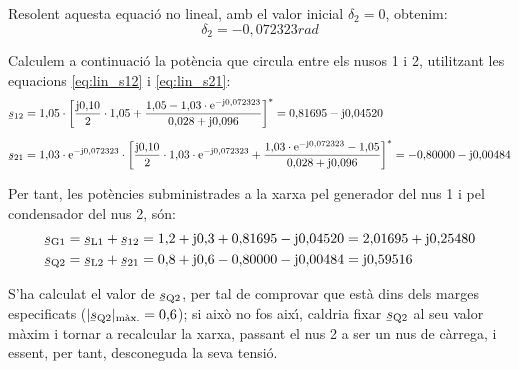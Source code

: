 \begin{exemple}
Resolent aquesta equaci\'{o} no lineal, amb el valor inicial $\delta_2=0$, obtenim:
\[\delta_2=-0{,}072323\unit{rad}\]

Calculem a continuaci\'{o} la pot\`{e}ncia que circula entre els nusos 1 i
2, utilitzant les equacions \eqref{eq:lin_s12} i \eqref{eq:lin_s21}:
\begin{align*}
\cmplx{s}_{12} &= 1{,}05 \cdot\left[ \frac{\ju0{,}10}{2} \cdot1{,}05 + \frac{ 1{,}05 -
1{,}03\cdot\eu^{-\ju0{,}072323}} {0{,}028+\ju0{,}096} \right]^* =
0{,}81695 - \ju 0{,}04520 \\[1.5ex]
\cmplx{s}_{21} &= 1{,}03\cdot \eu^{-\ju0{,}072323} \cdot\left[ \frac{\ju0{,}10}{2}\cdot
1{,}03\cdot \eu^{-\ju0{,}072323} + \frac{ 1{,}03\cdot\eu^{-\ju0{,}072323} -1{,}05}
{0{,}028+\ju0{,}096} \right]^* = -0{,}80000 - \ju 0{,}00484
\end{align*}

Per tant, les pot\`{e}ncies subministrades a la xarxa pel generador del
nus 1 i pel condensador del nus 2, s\'{o}n:
\begin{align*}
 \cmplx{s}\ped{G1} &= \cmplx{s}\ped{L1} + \cmplx{s}_{12} = 1{,}2+\ju0{,}3 + 0{,}81695 - \ju 0{,}04520 = 2{,}01695 + \ju 0{,}25480 \\
 \cmplx{s}\ped{Q2} &= \cmplx{s}\ped{L2} + \cmplx{s}_{21} = 0{,}8+\ju0{,}6 - 0{,}80000 - \ju 0{,}00484 =  \ju 0{,}59516
\end{align*}

S'ha calculat el valor de $\cmplx{s}\ped{Q2}$, per tal de comprovar
que est\`{a} dins dels marges especificats
($|\cmplx{s}\ped{Q2}|_{\text{m\`{a}x.}}=0{,}6$); si aix\`{o} no fos aix\'{\i},
caldria fixar $\cmplx{s}\ped{Q2}$ al seu valor m\`{a}xim i tornar a
recalcular la xarxa, passant el nus 2 a ser un nus de c\`{a}rrega, i
essent, per tant, desconeguda la seva tensi\'{o}.
\end{exemple}



